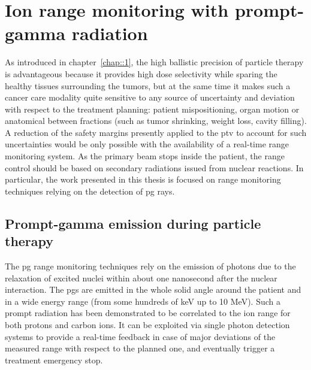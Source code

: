 \section{Ion range monitoring with prompt-gamma radiation}\label{chap2::sec::PGionRangeMonitoring}

As introduced in chapter~\ref{chap::1}, the high ballistic precision of particle therapy is advantageous because it provides high dose selectivity while sparing the healthy tissues surrounding the tumors, but at the same time it makes such a cancer care modality quite sensitive to any source of uncertainty and deviation with respect to the treatment planning: patient mispositioning, organ motion or anatomical between fractions (such as tumor shrinking, weight loss, cavity filling). A reduction of the safety margins presently applied to the \gls{ptv} to account for such uncertainties would be only possible with the availability of a real-time range monitoring system. As the primary beam stops inside the patient, the range control should be based on secondary radiations issued from nuclear reactions. In particular, the work presented in this thesis is focused on range monitoring techniques relying on the detection of \gls{pg} rays.
 
\subsection{Prompt-gamma emission during particle therapy}\label{chap2::subsec::PGproduction}

The \gls{pg} range monitoring techniques rely on the emission of photons due to the relaxation of excited nuclei within about one nanosecond after the nuclear interaction. The \glspl{pg} are emitted in the whole solid angle around the patient and in a wide energy range (from some hundreds of keV up to 10 MeV). Such a prompt radiation has been demonstrated to be correlated to the ion range for both protons and carbon ions. It can be exploited via single photon detection systems to provide a real-time feedback in case of major deviations of the measured range with respect to the planned one, and eventually trigger a treatment emergency stop.

